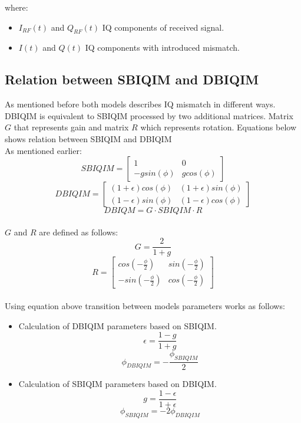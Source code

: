 \documentclass[en,printmode]{mgr}
\begin{document}
		where:
		\begin{itemize}
			\item $I_{RF}(t)$ and $Q_{RF}(t)$ IQ components of received signal.
			\item $I(t)$ and $Q(t)$ IQ components with introduced mismatch.
		\end{itemize}
		\newpage
		\subsection*{Relation between SBIQIM and DBIQIM}
			As mentioned before both models describes IQ mismatch in different ways. DBIQIM is
			equivalent to SBIQIM processed by two additional matrices. Matrix $G$ that represents gain
			and matrix $R$ which represents rotation.
			Equations below shows relation between SBIQIM and DBIQIM \cite{iq_model}
			\\
			
			
			As mentioned earlier:
			\[
				SBIQIM = 
				\begin{bmatrix}
				1 & 0 \\
				-g sin(\phi) & g cos(\phi)
				\end{bmatrix}
			\]
			\[
				DBIQIM = 
				\begin{bmatrix}
					(1 + \epsilon) cos(\phi) & (1 + \epsilon) sin(\phi) \\
					(1 - \epsilon) sin(\phi) & (1 - \epsilon) cos(\phi)
				\end{bmatrix}
			\]
			\vspace{0.5cm}
			\begin{equation}
				DBIQM = G\cdot SBIQIM \cdot R
			\end{equation}
			\\
			
			
			$G$ and $R$ are defined as follows:
			\begin{equation}
				G = \frac{2}{1+g}
			\end{equation}
			\begin{equation}
				R = 
				\begin{bmatrix}
					cos(-\frac{\phi}{2}) & sin(-\frac{\phi}{2}) \\
				   -sin(-\frac{\phi}{2}) & cos(-\frac{\phi}{2})
				\end{bmatrix}
			\end{equation}
			\\
			
			
			Using equation above transition between models parameters works as follows:
			\begin{itemize}
				\item Calculation of DBIQIM parameters based on SBIQIM.
				\[
					\epsilon = \frac{1-g}{1+g}
				\]
				\[
					\phi_{DBIQIM} = - \frac{\phi_{SBIQIM}}{2}
				\]
				\item Calculation of SBIQIM parameters based on DBIQIM.
				\[
					g = \frac{1-\epsilon}{1+\epsilon}
				\]
				\[
					\phi_{SBIQIM} = - 2\phi_{DBIQIM}
				\]
			\end{itemize}
			
\end{document}
